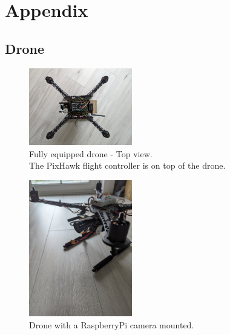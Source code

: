 \graphicspath{{./figures/}}
\chapter*{Appendix}
\renewcommand{\thesection}{\Alph{section}}

\section{Drone}
\label{sec:appendix_drone}
\begin{figure}[htbp]
    \centering
    \includegraphics[width=0.4\textwidth]{drone_fully_top.jpg}
    \caption[Fully equipped drone]{Fully equipped drone - Top view.\\
    The PixHawk flight controller is on top of the drone.}
\end{figure}

\begin{figure}[htbp]
    \centering
    \includegraphics[width=0.4\textwidth]{drone_cam.jpg}
    \caption[Drone with camera]{Drone with a RaspberryPi camera mounted.\\}
\end{figure}
\FloatBarrier
\newpage

